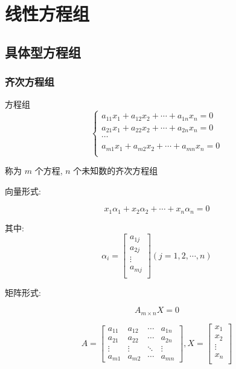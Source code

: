 \chapter{线性方程组}
\section{具体型方程组}
\subsection{齐次方程组}
\begin{definition}[齐次方程组]

	方程组
	$$\begin{cases}
		a_{11}x_{1}+a_{12}x_{2}+\cdots+a_{1n}x_{n}=0\\
		a_{21}x_{1}+a_{22}x_{2}+\cdots+a_{2n}x_{n}=0\\
		\cdots\\
		a_{m1}x_{1}+a_{m2}x_{2}+\cdots+a_{mn}x_{n}=0\\
	\end{cases}$$

	称为 $m$ 个方程, $n$ 个未知数的齐次方程组
	
	向量形式:  
	
	$$x_{1}\alpha_{1}+x_{2}\alpha_{2}+\cdots+x_{n}\alpha_{n}=0$$
	
	其中:  
	$$\alpha_{i} = \begin{bmatrix}
		a_{1j}\\
		a_{2j}\\
		\vdots\\
		a_{mj}\\
	\end{bmatrix} (j = 1,2,\cdots,n)$$
	
	矩阵形式:  
	
	$$A_{m\times n}X=0$$
	
	$$A = 
	\begin{bmatrix}
		a_{11} & a_{12} & \cdots & a_{1n}\\
		a_{21} & a_{22} & \cdots & a_{2n}\\
		\vdots & \vdots & \ddots & \vdots\\
		a_{m1} & a_{m2} & \cdots & a_{mn}
	\end{bmatrix}, 
	X = \begin{bmatrix}
		x_{1}\\
		x_{2}\\
		\vdots\\
		x_{n}\\
	\end{bmatrix}$$
	

\end{definition}

